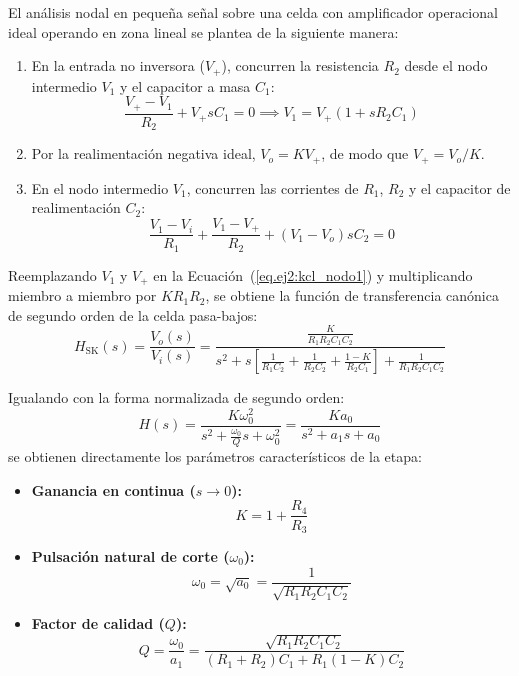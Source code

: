 El análisis nodal en pequeña señal sobre una celda con amplificador operacional ideal operando en zona lineal se plantea
de la siguiente manera:
\begin{enumerate}
    \item En la entrada no inversora ($V_+$), concurren la resistencia $R_2$ desde el nodo intermedio $V_1$ y el
        capacitor a masa $C_1$:
        \begin{equation}
            \frac{V_+ - V_1}{R_2} + V_+ s C_1 = 0 \implies V_1 = V_+ (1 + s R_2 C_1)
        \end{equation}

    \item Por la realimentación negativa ideal, $V_o = K V_+$, de modo que $V_+ = V_o / K$.

    \item En el nodo intermedio $V_1$, concurren las corrientes de $R_1$, $R_2$ y el capacitor de realimentación $C_2$:
        \begin{equation}
            \label{eq.ej2:kcl_nodo1}
            \frac{V_1 - V_i}{R_1} + \frac{V_1 - V_+}{R_2} + (V_1 - V_o) s C_2 = 0
        \end{equation}
\end{enumerate}

Reemplazando $V_1$ y $V_+$ en la Ecuación~(\ref{eq.ej2:kcl_nodo1}) y multiplicando miembro a miembro por $K R_1 R_2$, se
obtiene la función de transferencia canónica de segundo orden de la celda pasa-bajos:
\begin{equation}
    H_{\text{SK}}(s) = \frac{V_o(s)}{V_i(s)} = \frac{\frac{K}{R_1 R_2 C_1 C_2}}{s^2 + s \left[ \frac{1}{R_1 C_2} + \frac{1}{R_2 C_2} + \frac{1 - K}{R_2 C_1} \right] + \frac{1}{R_1 R_2 C_1 C_2}}
\end{equation}

Igualando con la forma normalizada de segundo orden:
\begin{equation}
    H(s) = \frac{K \omega_0^2}{s^2 + \frac{\omega_0}{Q} s + \omega_0^2} = \frac{K a_0}{s^2 + a_1 s + a_0}
\end{equation}
se obtienen directamente los parámetros característicos de la etapa:
\begin{itemize}
    \item \textbf{Ganancia en continua ($s \to 0$):}
        \begin{equation}
            K = 1 + \frac{R_4}{R_3}
        \end{equation}
    \item \textbf{Pulsación natural de corte ($\omega_0$):}
        \begin{equation}
            \omega_0 = \sqrt{a_0} = \frac{1}{\sqrt{R_1 R_2 C_1 C_2}}
        \end{equation}
    \item \textbf{Factor de calidad ($Q$):}
        \begin{equation}
            Q = \frac{\omega_0}{a_1} = \frac{\sqrt{R_1 R_2 C_1 C_2}}{(R_1 + R_2) C_1 + R_1 (1 - K) C_2}
        \end{equation}
\end{itemize}

